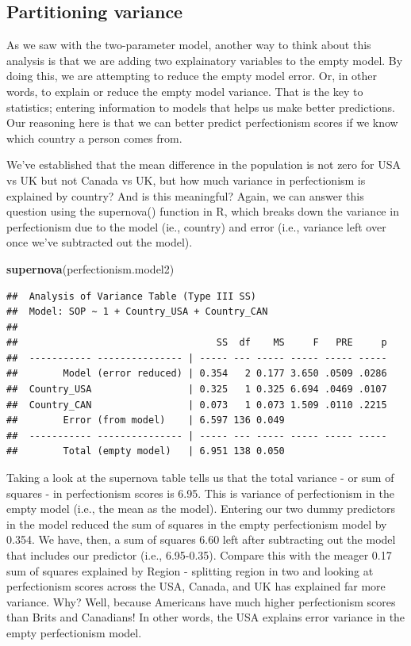 \documentclass[
]{article}
\newenvironment{Shaded}{\begin{snugshade}}{\end{snugshade}}
\newcommand{\FunctionTok}[1]{\textcolor[rgb]{0.13,0.29,0.53}{\textbf{#1}}}
\newcommand{\NormalTok}[1]{#1}
\begin{document}
\subsection{Partitioning variance}\label{partitioning-variance-1}

As we saw with the two-parameter model, another way to think about this
analysis is that we are adding two explainatory variables to the empty
model. By doing this, we are attempting to reduce the empty model error.
Or, in other words, to explain or reduce the empty model variance. That
is the key to statistics; entering information to models that helps us
make better predictions. Our reasoning here is that we can better
predict perfectionism scores if we know which country a person comes
from.

We've established that the mean difference in the population is not zero
for USA vs UK but not Canada vs UK, but how much variance in
perfectionism is explained by country? And is this meaningful? Again, we
can answer this question using the supernova() function in R, which
breaks down the variance in perfectionism due to the model (ie.,
country) and error (i.e., variance left over once we've subtracted out
the model).

\begin{Shaded}
\begin{Highlighting}[]
\FunctionTok{supernova}\NormalTok{(perfectionism.model2)}
\end{Highlighting}
\end{Shaded}

\begin{verbatim}
##  Analysis of Variance Table (Type III SS)
##  Model: SOP ~ 1 + Country_USA + Country_CAN
## 
##                                   SS  df    MS     F   PRE     p
##  ----------- --------------- | ----- --- ----- ----- ----- -----
##        Model (error reduced) | 0.354   2 0.177 3.650 .0509 .0286
##  Country_USA                 | 0.325   1 0.325 6.694 .0469 .0107
##  Country_CAN                 | 0.073   1 0.073 1.509 .0110 .2215
##        Error (from model)    | 6.597 136 0.049                  
##  ----------- --------------- | ----- --- ----- ----- ----- -----
##        Total (empty model)   | 6.951 138 0.050
\end{verbatim}

Taking a look at the supernova table tells us that the total variance -
or sum of squares - in perfectionism scores is 6.95. This is variance of
perfectionism in the empty model (i.e., the mean as the model). Entering
our two dummy predictors in the model reduced the sum of squares in the
empty perfectionism model by 0.354. We have, then, a sum of squares 6.60
left after subtracting out the model that includes our predictor (i.e.,
6.95-0.35). Compare this with the meager 0.17 sum of squares explained
by Region - splitting region in two and looking at perfectionism scores
across the USA, Canada, and UK has explained far more variance. Why?
Well, because Americans have much higher perfectionism scores than Brits
and Canadians! In other words, the USA explains error variance in the
empty perfectionism model.
\end{document}
